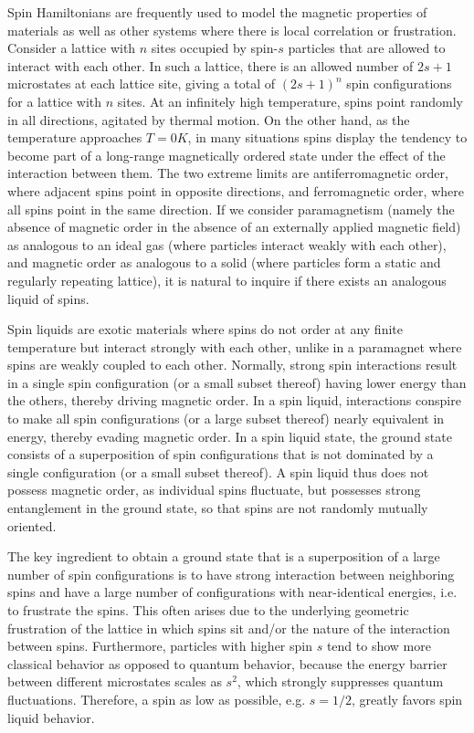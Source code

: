 Spin Hamiltonians are frequently used to model the magnetic properties of materials as well as other systems where there is local correlation or frustration. Consider a lattice with $n$ sites occupied by spin-$s$ particles that are allowed to interact with each other.
In such a lattice, there is an allowed number of $2s+1$ microstates at each lattice site, giving a total of $(2s+1)^n$ spin configurations for a lattice with $n$ sites. 
At an infinitely high temperature, spins point randomly in all directions, agitated by thermal motion. 
On the other hand, as the temperature approaches $T=0K$, in many situations spins display the tendency to become part of a long-range magnetically ordered state under the effect of the interaction between them. The two extreme limits are antiferromagnetic order, where adjacent spins point in opposite directions, and ferromagnetic order, where all spins point in the same direction.
If we consider paramagnetism (namely the absence of magnetic order in the absence of an externally applied magnetic field) as analogous to an ideal gas (where particles interact weakly with each other), and magnetic order as analogous to a solid (where particles form a static and regularly repeating lattice), it is natural to inquire if there exists an analogous liquid of spins.

Spin liquids \cite{savary2016quantum,zhou2017quantum,chamorro2020chemistry,sears2017phase,PhysRevA.106.022434,li2023benchmarking} are exotic materials where spins do not order at any finite temperature but interact strongly with each other, unlike in a paramagnet where spins are weakly coupled to each other.
Normally, strong spin interactions result in a single spin configuration (or a small subset thereof) having lower energy than the others, thereby driving magnetic order.  In a spin liquid, interactions conspire to make all spin configurations (or a large subset thereof) nearly equivalent in energy, thereby evading magnetic order.
In a spin liquid state, the ground state consists of a superposition of spin configurations that is not dominated by a single configuration (or a small subset thereof). A spin liquid thus does not possess magnetic order, as individual spins fluctuate, but possesses strong entanglement in the ground state, so that spins are not randomly mutually oriented.

The key ingredient to obtain a ground state that is a superposition of a large number of spin configurations is to have strong interaction between neighboring spins and have a large number of configurations with near-identical energies, i.e. to frustrate the spins. This often arises due to the underlying geometric frustration of the lattice in which spins sit and/or the nature of the interaction between spins. Furthermore, particles with higher spin $s$ tend to show more classical behavior as opposed to quantum behavior, because the energy barrier between different microstates scales as $s^2$, which strongly suppresses quantum fluctuations. Therefore, a spin as low as possible, e.g. $s=1/2$, greatly favors spin liquid behavior.

